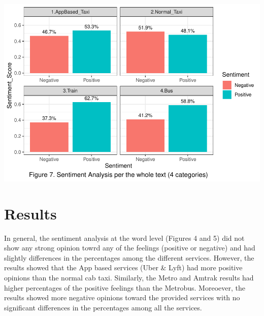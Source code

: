 \documentclass[
  12pt,
]{article}
\begin{document}
\includegraphics{Class_Project_Report_files/figure-latex/unnamed-chunk-19-1.pdf}

\hypertarget{results}{%
\section{Results}\label{results}}

In general, the sentiment analysis at the word level (Figures 4 and 5)
did not show any strong opinion towrd any of the feelings (positive or
negative) and had slightly differences in the percentages among the
different services. However, the results showed that the App based
services (Uber \& Lyft) had more positive opinions than the normal cab
taxi. Similarly, the Metro and Amtrak results had higher percentages of
the positive feelings than the Metrobus. Moreoever, the results showed
more negative opinions toward the provided services with no significant
differences in the percentages among all the services.
\end{document}
